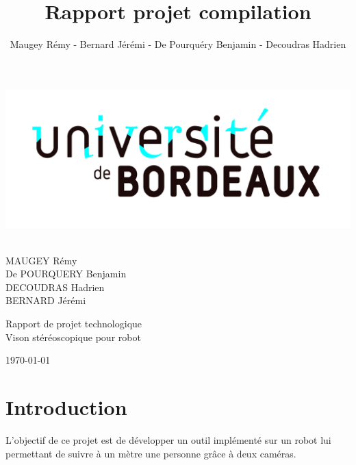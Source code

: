 \documentclass[12pt,a4paper]{report}
\author{Maugey Rémy - Bernard Jérémi - De Pourquéry Benjamin - Decoudras Hadrien}
\title{Rapport projet compilation}
\begin{document}
\begin{titlepage}
  \begin{sffamily}
  \begin{center}

    \includegraphics[scale=0.05]{logo.jpg}~\\[1.5cm]
    \begin{minipage}{0.43\textwidth}
      \begin{flushleft} \large
		MAUGEY Rémy\\
		De POURQUERY Benjamin\\
		DECOUDRAS Hadrien\\
		BERNARD Jérémi\\		
		
      \end{flushleft}
    \end{minipage}

	\vspace*{\fill}
	\Huge{Rapport de projet technologique}\\
	\Large{Vison stéréoscopique pour robot}\\
	\vspace*{\fill}

	\vfill
    {\large \today}

  \end{center}
  \end{sffamily}
\end{titlepage}

\chapter{Introduction}


L'objectif de ce projet est de développer un outil implémenté sur un robot lui permettant de suivre à un mètre une personne grâce à deux caméras.\\\\
\end{document}
